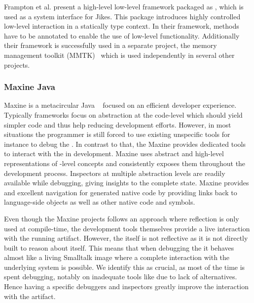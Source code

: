Frampton et al. present a high-level low-level framework packaged as , which is used as a system interface for Jikes. This package introduces highly controlled low-level interaction in a statically type context.
In their framework, methods have to be annotated to enable the use of low-level functionality.
Additionally their framework is successfully used in a separate project, the memory management toolkit (\textsc{MMTK})~\cite{Blac04a} which is used independently in several other projects.


\subsubsection*{Maxine Java \VM}
Maxine is a metacircular Java \VM~\cite{Wimm13a} focused on an efficient developer experience.
Typically \VM frameworks focus on abstraction at the code-level which should yield simpler code and thus help reducing development efforts.
However, in most situations the programmer is still forced to use existing unspecific tools for instance to debug the \VM.
In contrast to that, the Maxine \VM provides dedicated tools to interact with the \VM in development.
Maxine uses abstract and high-level representations of \VM-level concepts and consistently exposes them throughout the development process.
Inspectors at multiple abstraction levels are readily available while debugging, giving insights to the complete \VM state.
Maxine provides and excellent navigation for generated native code by providing links back to language-side objects as well as other native code and symbols.

Even though the Maxine projects follows an approach where reflection is only used at compile-time, the development tools themselves provide a live interaction with the running \VM artifact.
However, the \VM itself is not reflective as it is not directly built to reason about itself.
This means that when debugging the \VM it behaves almost like a living Smalltalk image where a complete interaction with the underlying system is possible.
We identify this as crucial, as most of the time is spent debugging, notably on inadequate tools like  due to lack of alternatives.
Hence having a specific debuggers and inspectors greatly improve the interaction with the \VM artifact.


